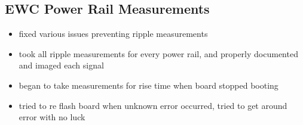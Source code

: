 \documentclass{article}
\begin{document}
\subsection*{EWC Power Rail Measurements}
\begin{itemize}
    \item fixed various issues preventing ripple measurements
    \item took all ripple measurements for every power rail, and properly documented and imaged each signal
    \item began to take measurements for rise time when board stopped booting
    \item tried to re flash board when unknown error occurred, tried to get around error with no luck
\end{itemize}
\end{document}
